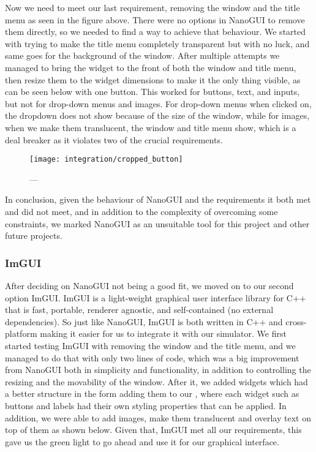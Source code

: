 Now we need to meet our last requirement, removing the window and the title menu as seen in the figure above. There were no options in NanoGUI to remove them directly, so we needed to find a way to achieve that behaviour. We started with trying to make the title menu completely transparent but with no luck, and same goes for the background of the window. After multiple attempts we managed to bring the widget to the front of both the window and title menu, then resize them to the widget dimensions to make it the only thing visible, as can be seen below with one button. This worked for buttons, text, and inputs, but not for drop-down menus and images. For drop-down menus when clicked on, the dropdown does not show because of the size of the window, while for images, when we make them translucent, the window and title menu show, which is a deal breaker as it violates two of the crucial requirements.

\begin{figure}
  \centering%
  \texttt{[image: integration/cropped\_button]}
  \caption{---}\label{fig:}
\end{figure}

In conclusion, given the behaviour of NanoGUI and the requirements it both met and did not meet, and in addition to the complexity of overcoming some constraints, we marked NanoGUI as an unsuitable tool for this project and other future projects.

\subsubsection{ImGUI}\label{ssec:imgui}
After deciding on NanoGUI not being a good fit, we moved on to our second option ImGUI. ImGUI is a light-weight graphical user interface library for C++ that is fast, portable, renderer agnostic, and self-contained (no external dependencies). So just like NanoGUI, ImGUI is both written in C++ and cross-platform making it easier for us to integrate it with our simulator. We first started testing ImGUI with removing the window and the title menu, and we managed to do that with only two lines of code, which was a big improvement from NanoGUI both in simplicity and functionality, in addition to controlling the resizing and the movability of the window. After it, we added widgets which had a better structure in the form adding them to our , where each widget such as buttons and labels had their own styling properties that can be applied. In addition, we were able to add images, make them translucent and overlay text on top of them as shown below. Given that, ImGUI met all our requirements, this gave us the green light to go ahead and use it for our graphical interface.

